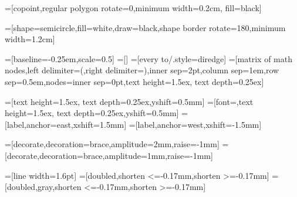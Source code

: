 
\def\swangle{-145}
\def\seangle{-35}
\def\nwangle{145}
\def\neangle{35}

=[copoint,regular polygon rotate=0,minimum width=0.2cm, fill=black]

=[shape=semicircle,fill=white,draw=black,shape border rotate=180,minimum width=1.2cm]

%
%


=[baseline=-0.25em,scale=0.5]
=[] %
=[every to/.style={diredge}]
=[matrix of math nodes,left delimiter=(,right delimiter=),inner sep=2pt,column sep=1em,row sep=0.5em,nodes={inner sep=0pt},text height=1.5ex, text depth=0.25ex]


=[text height=1.5ex, text depth=0.25ex,yshift=0.5mm]
=[font=\footnotesize,text height=1.5ex, text depth=0.25ex,yshift=0.5mm]
=[label,anchor=east,xshift=1.5mm]
=[label,anchor=west,xshift=-1.5mm]

\newcommand{\phantombox}[1]{\tikz[baseline=(current bounding box).east]{\path [use as bounding box] (0,0) rectangle #1;}}
=[decorate,decoration={brace,amplitude=2mm,raise=-1mm}]
=[decorate,decoration={brace,amplitude=1mm,raise=-1mm}]

=[line width=1.6pt] %
=[doubled,shorten <=-0.17mm,shorten >=-0.17mm]
=[doubled,gray,shorten <=-0.17mm,shorten >=-0.17mm]

